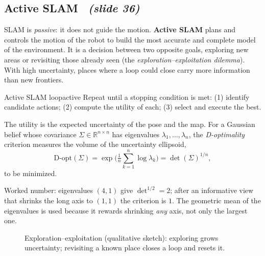 \documentclass[11pt,a4paper]{article}
\newcommand{\slrs}[1]{\texorpdfstring{\ \emph{(slide #1)}}{ (slide #1)}}
\newcommand{\R}{\mathbb{R}}
\begin{document}
\subsection{Active SLAM \slrs{36}}
SLAM is \emph{passive}: it does not guide the motion. \textbf{Active SLAM} plans and controls the motion of the robot to build the most accurate and complete model of the environment. It is a decision between two opposite goals, exploring new areas or revisiting those already seen (the \emph{exploration--exploitation dilemma}). With high uncertainty, places where a loop could close carry more information than new frontiers.
\begin{algorithm}{Active SLAM loop}{active}
Repeat until a stopping condition is met: (1) identify candidate actions; (2) compute the utility of each; (3) select and execute the best.
\end{algorithm}
The utility is the expected uncertainty of the pose and the map. For a Gaussian belief whose covariance $\Sigma\in\R^{n\times n}$ has eigenvalues $\lambda_1,\dots,\lambda_n$, the \emph{D-optimality} criterion measures the volume of the uncertainty ellipsoid,
\[
\text{D-opt}(\Sigma)=\exp\!\Big(\tfrac1n\sum_{k=1}^n\log\lambda_k\Big)=\det(\Sigma)^{1/n},
\]
to be minimized.
\begin{intuition}
Worked number: eigenvalues $(4,1)$ give $\det^{1/2}=2$; after an informative view that shrinks the long axis to $(1,1)$ the criterion is $1$. The geometric mean of the eigenvalues is used because it rewards shrinking \emph{any} axis, not only the largest one.
\end{intuition}
\begin{figure}[htbp]\centering
{}
\caption{Exploration--exploitation (qualitative sketch): exploring grows uncertainty; revisiting a known place closes a loop and resets it.}
\end{figure}
\end{document}
